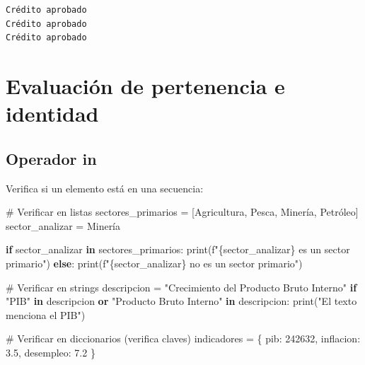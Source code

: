 \documentclass[
  doc,
  floatsintext,
  longtable,
  a4paper,
  nolmodern,
  notxfonts,
  notimes,
  12pt,
  colorlinks=true,linkcolor=blue,citecolor=blue,urlcolor=blue]{apa7}
\newenvironment{Shaded}{\begin{snugshade}}{\end{snugshade}}
\newcommand{\BuiltInTok}[1]{\textcolor[rgb]{0.00,0.23,0.31}{#1}}
\newcommand{\CommentTok}[1]{\textcolor[rgb]{0.37,0.37,0.37}{#1}}
\newcommand{\ControlFlowTok}[1]{\textcolor[rgb]{0.00,0.23,0.31}{\textbf{#1}}}
\newcommand{\DecValTok}[1]{\textcolor[rgb]{0.68,0.00,0.00}{#1}}
\newcommand{\FloatTok}[1]{\textcolor[rgb]{0.68,0.00,0.00}{#1}}
\newcommand{\KeywordTok}[1]{\textcolor[rgb]{0.00,0.23,0.31}{\textbf{#1}}}
\newcommand{\NormalTok}[1]{\textcolor[rgb]{0.00,0.23,0.31}{#1}}
\newcommand{\OperatorTok}[1]{\textcolor[rgb]{0.37,0.37,0.37}{#1}}
\newcommand{\SpecialCharTok}[1]{\textcolor[rgb]{0.37,0.37,0.37}{#1}}
\newcommand{\SpecialStringTok}[1]{\textcolor[rgb]{0.13,0.47,0.30}{#1}}
\newcommand{\StringTok}[1]{\textcolor[rgb]{0.13,0.47,0.30}{#1}}
\begin{document}
\begin{verbatim}
Crédito aprobado
Crédito aprobado
Crédito aprobado
\end{verbatim}

\section{Evaluación de pertenencia e
identidad}\label{evaluaciuxf3n-de-pertenencia-e-identidad}

\subsection{Operador in}\label{operador-in}

Verifica si un elemento está en una secuencia:

\begin{Shaded}
\begin{Highlighting}[]
\CommentTok{\# Verificar en listas}
\NormalTok{sectores\_primarios }\OperatorTok{=}\NormalTok{ [}\StringTok{\textquotesingle{}Agricultura\textquotesingle{}}\NormalTok{, }\StringTok{\textquotesingle{}Pesca\textquotesingle{}}\NormalTok{, }\StringTok{\textquotesingle{}Minería\textquotesingle{}}\NormalTok{, }\StringTok{\textquotesingle{}Petróleo\textquotesingle{}}\NormalTok{]}
\NormalTok{sector\_analizar }\OperatorTok{=} \StringTok{\textquotesingle{}Minería\textquotesingle{}}

\ControlFlowTok{if}\NormalTok{ sector\_analizar }\KeywordTok{in}\NormalTok{ sectores\_primarios:}
    \BuiltInTok{print}\NormalTok{(}\SpecialStringTok{f"}\SpecialCharTok{\{}\NormalTok{sector\_analizar}\SpecialCharTok{\}}\SpecialStringTok{ es un sector primario"}\NormalTok{)}
\ControlFlowTok{else}\NormalTok{:}
    \BuiltInTok{print}\NormalTok{(}\SpecialStringTok{f"}\SpecialCharTok{\{}\NormalTok{sector\_analizar}\SpecialCharTok{\}}\SpecialStringTok{ no es un sector primario"}\NormalTok{)}

\CommentTok{\# Verificar en strings}
\NormalTok{descripcion }\OperatorTok{=} \StringTok{"Crecimiento del Producto Bruto Interno"}
\ControlFlowTok{if} \StringTok{"PIB"} \KeywordTok{in}\NormalTok{ descripcion }\KeywordTok{or} \StringTok{"Producto Bruto Interno"} \KeywordTok{in}\NormalTok{ descripcion:}
    \BuiltInTok{print}\NormalTok{(}\StringTok{"El texto menciona el PIB"}\NormalTok{)}

\CommentTok{\# Verificar en diccionarios (verifica claves)}
\NormalTok{indicadores }\OperatorTok{=}\NormalTok{ \{}
    \StringTok{\textquotesingle{}pib\textquotesingle{}}\NormalTok{: }\DecValTok{242632}\NormalTok{,}
    \StringTok{\textquotesingle{}inflacion\textquotesingle{}}\NormalTok{: }\FloatTok{3.5}\NormalTok{,}
    \StringTok{\textquotesingle{}desempleo\textquotesingle{}}\NormalTok{: }\FloatTok{7.2}
\NormalTok{\}}


\end{Highlighting}
\end{Shaded}
\end{document}
